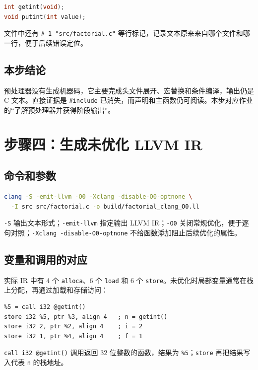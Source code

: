 \documentclass[UTF8,a4paper,12pt]{ctexart}
\begin{document}
\begin{lstlisting}[language=C]
int getint(void);
void putint(int value);
\end{lstlisting}

文件中还有 \texttt{\# 1 "src/factorial.c"} 等行标记，记录文本原来来自哪个文件和哪一行，便于后续错误定位。

\subsection{本步结论}

预处理器没有生成机器码，它主要完成头文件展开、宏替换和条件编译，输出仍是 C 文本。直接证据是 \texttt{\#include} 已消失，而声明和主函数仍可阅读。本步对应作业的“了解预处理器并获得阶段输出”。

\section{步骤四：生成未优化 LLVM IR}

\subsection{命令和参数}

\begin{lstlisting}[language=bash]
clang -S -emit-llvm -O0 -Xclang -disable-O0-optnone \
  -I src src/factorial.c -o build/factorial_clang_O0.ll
\end{lstlisting}

\texttt{-S} 输出文本形式；\texttt{-emit-llvm} 指定输出 LLVM IR；\texttt{-O0} 关闭常规优化，便于逐句对照；\texttt{-Xclang -disable-O0-optnone} 不给函数添加阻止后续优化的属性。

\subsection{变量和调用的对应}

实际 IR 中有 4 个 \texttt{alloca}、6 个 \texttt{load} 和 6 个 \texttt{store}。未优化时局部变量通常在栈上分配，再通过加载和存储访问：

\begin{lstlisting}
%5 = call i32 @getint()
store i32 %5, ptr %3, align 4   ; n = getint()
store i32 2, ptr %2, align 4    ; i = 2
store i32 1, ptr %4, align 4    ; f = 1
\end{lstlisting}

\texttt{call i32 @getint()} 调用返回 32 位整数的函数，结果为 \texttt{\%5}；\texttt{store} 再把结果写入代表 \texttt{n} 的栈地址。
\end{document}

